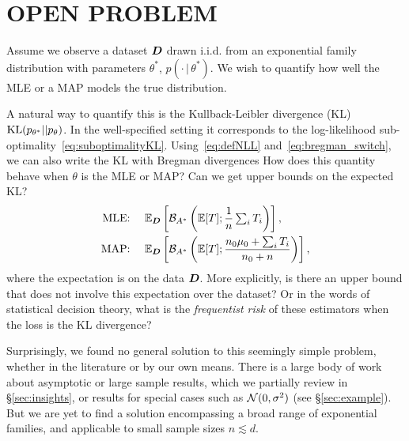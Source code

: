 \documentclass[twoside]{article}
\let\oldsection\section
\renewcommand{\section}[1]{\oldsection{\texorpdfstring{\uppercase{#1}}{#1}}}
\newcommand*{\expect}[2][]{\ensuremath{\mathbb{E}_{#1} \left[ #2 \right] }} %
\newcommand{\cond}{\,\vert\,}
\newcommand{\logpart}{A}
\newcommand{\bregman}{\cB_\logpart}
\newcommand{\bregmanconj}{\cB_{\logpart^*}}
\newcommand{\nat}{\theta}
\newcommand{\m}{\mu}
\begin{document}
\section{Open Problem}
\label{sec:problem}

Assume we observe a dataset ${\bm{D}}$ drawn i.i.d. from an exponential family distribution
with parameters $\nat^*$, $p(\cdot \cond\nat^*)$.
We wish to quantify how well the MLE or a MAP models the true distribution.

A natural way to quantify this is the Kullback-Leibler divergence (KL) $\KL(p_{\nat^*} || p_\nat)$. %
In the well-specified setting it corresponds to the log-likelihood sub-optimality~\eqref{eq:suboptimalityKL}.
Using~\eqref{eq:defNLL} and~\eqref{eq:bregman_switch}, we can also write the KL with Bregman divergences
\alignn{
	\KL(p_{\nat^*} || p_\nat)
	 = \bregman(\nat ; \nat^*)
	 = \bregmanconj(\m^* ; \m) \; .
}
How does this quantity behave when $\nat$ is the MLE or MAP?
Can we get upper bounds on the expected KL?
\begin{align}
	\label{eq:bregmanMLE}
	\text{MLE: } \quad &\expect[\mD]{\bregmanconj \left (\E [T] ;  \inv{n}  \smallsum_i T_i \right )}, \\
	\label{eq:bregmanMAP}
	\text{MAP: } \quad &\expect[\mD]{\bregmanconj \left (\E [T] ; \frac{n_0 \m_0 + \smallsum_i T_i}{n_0+n} \right )},
\end{align}
where the expectation is on the data ${\bm{D}}$.
More explicitly, is there an upper bound that does not involve this expectation over the dataset?
Or in the words of statistical decision theory, what is the \emph{frequentist risk} of these estimators
when the loss is the KL divergence?

Surprisingly, we found no general solution to this seemingly simple problem, whether in the literature or by our own means.
There is a large body of work about asymptotic or large sample results, which we partially review in \S\ref{sec:insights},
or results for special cases such as ${\mathcal N}(0, \sigma^2)$ (see \S\ref{sec:example}).
But we are yet to find a solution encompassing a broad range of exponential families,
and applicable to small sample sizes $n \lesssim d$.
\end{document}

